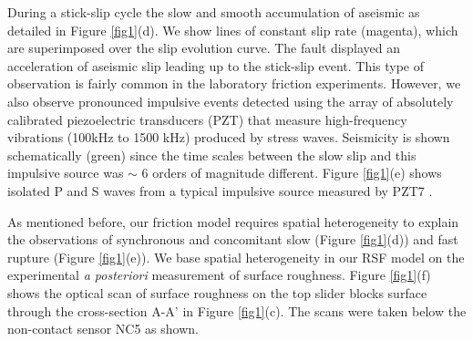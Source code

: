 \documentclass[preprint,1p, 10pt,authoryear]{elsarticle}
\begin{document}
During a stick-slip cycle the slow and smooth accumulation of aseismic as detailed in Figure \ref{fig1}(d). We show lines of constant slip rate (magenta), which are superimposed over the slip evolution curve.  The fault displayed an acceleration of aseismic slip leading up to the stick-slip event. This type of observation is fairly common in the laboratory friction experiments. However, we also observe pronounced impulsive events detected using the array of absolutely calibrated piezoelectric transducers (PZT) that measure high-frequency vibrations (100kHz to 1500 kHz) produced by stress waves. Seismicity is shown schematically (green) since the time scales between the slow slip and this impulsive source was $\sim$ 6 orders of magnitude different.  Figure \ref{fig1}(e) shows isolated P and S waves from a typical impulsive source measured by PZT7  \citep{Selvadurai2019}.
 
As mentioned before, our friction model requires spatial heterogeneity to explain the observations of synchronous and concomitant slow (Figure \ref{fig1}(d)) and fast rupture (Figure \ref{fig1}(e)). We base spatial heterogeneity in our RSF model on the experimental \textit{a posteriori} measurement of surface roughness. Figure \ref{fig1}(f) shows the optical scan of surface roughness on the top slider blocks surface through the cross-section A-A' in Figure \ref{fig1}(c).  The scans were taken below the non-contact sensor NC5 as shown.
\end{document}
